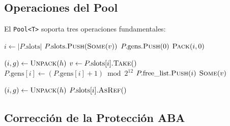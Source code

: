 \documentclass[11pt,twoside,openright]{book}
\theoremstyle{definition}
\theoremstyle{plain}
\theoremstyle{remark}
\begin{document}
\subsection{Operaciones del Pool}

El \texttt{Pool<T>} soporta tres operaciones fundamentales:

\begin{algorithm}[H]
\caption{\textsc{Pool-Alloc}$(P, v)$: Asignar un valor $v$ en el pool $P$.}
\label{alg:pool-alloc}
$i \gets |P.\text{slots}|$\;
$P.\text{slots}.\textsc{Push}(\textsc{Some}(v))$\;
$P.\text{gens}.\textsc{Push}(0)$\;
\Return $\textsc{Pack}(i, 0)$\;
\end{algorithm}

\begin{algorithm}[H]
\caption{\textsc{Pool-Free}$(P, h)$: Liberar el slot referenciado por $h$.}
\label{alg:pool-free}
$(i, g) \gets \textsc{Unpack}(h)$\;
$v \gets P.\text{slots}[i].\textsc{Take}()$\;
$P.\text{gens}[i] \gets (P.\text{gens}[i] + 1) \bmod 2^{12}$\;
$P.\text{free\_list}.\textsc{Push}(i)$\;
\Return $\textsc{Some}(v)$\;
\end{algorithm}

\begin{algorithm}[H]
\caption{\textsc{Pool-Get}$(P, h)$: Buscar el valor referenciado por $h$.}
\label{alg:pool-get}
$(i, g) \gets \textsc{Unpack}(h)$\;
\Return $P.\text{slots}[i].\textsc{AsRef}()$\;
\end{algorithm}

\subsection{Corrección de la Protección ABA}
\end{document}
